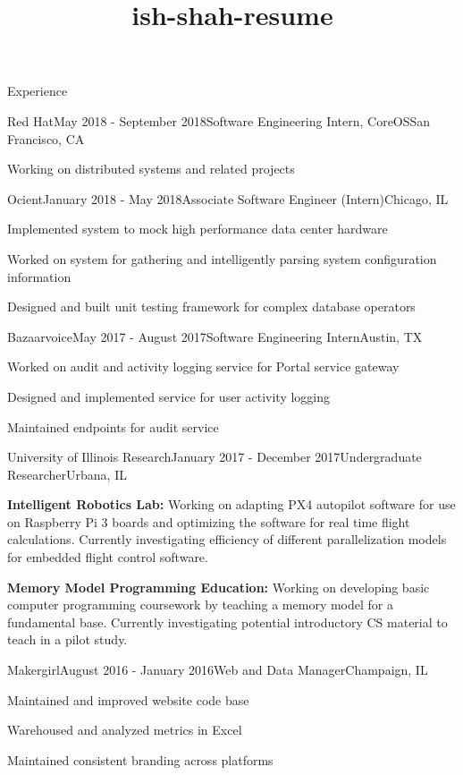 \documentclass{resume} %
\title{ish-shah-resume}
\begin{document}
    
    \begin{rSection}{Experience}
    
    \begin{rSubsection}{Red Hat}{May 2018 - September 2018}{Software Engineering Intern, CoreOS}{San Francisco, CA}
    \item Working on distributed systems and related projects
    \end{rSubsection}
    
    \begin{rSubsection}{Ocient}{January 2018 - May 2018}{Associate Software Engineer (Intern)}{Chicago, IL}
    \item Implemented system to mock high performance data center hardware
    \item Worked on system for gathering and intelligently parsing system configuration information
    \item Designed and built unit testing framework for complex database operators    
    \end{rSubsection}
    
    \begin{rSubsection}{Bazaarvoice}{May 2017 - August 2017}{Software Engineering Intern}{Austin, TX}
    \item Worked on audit and activity logging service for Portal service gateway
    \item Designed and implemented service for user activity logging
    \item Maintained endpoints for audit service
    \end{rSubsection}
    
    \begin{rSubsection}{University of Illinois Research}{January 2017 - December 2017}{Undergraduate Researcher}{Urbana, IL}
    \item \textbf{Intelligent Robotics Lab:} Working on adapting PX4 autopilot software for use on Raspberry Pi 3 boards and optimizing the software for real time flight calculations. Currently investigating efficiency of different parallelization models for embedded flight control software.
    \item \textbf{Memory Model Programming Education:} Working on developing basic computer programming coursework by teaching a memory model for a fundamental base. Currently investigating potential introductory CS material to teach in a pilot study.
    \end{rSubsection}
    
    \begin{rSubsection}{Makergirl}{August 2016 - January 2016}{Web and Data Manager}{Champaign, IL}
    \item Maintained and improved website code base
    \item Warehoused and analyzed metrics in Excel
    \item Maintained consistent branding across platforms
    \end{rSubsection}
    
    \end{rSection}
    
\end{document}
